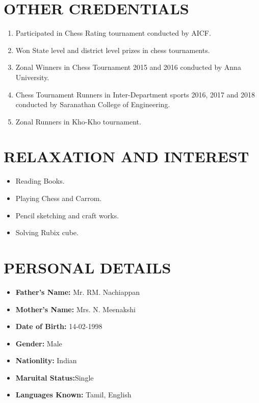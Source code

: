 \documentclass[margin,line]{res}
\begin{document}
\begin{resume}
\section{\sc OTHER CREDENTIALS}
\begin{enumerate}
\item Participated in Chess Rating tournament conducted by AICF.
\item Won State level and district level prizes in chess tournaments.
\item Zonal Winners in Chess Tournament 2015 and 2016 conducted by Anna University.
\item Chess Tournament Runners in Inter-Department sports 2016, 2017 and  2018 conducted by Saranathan College of Engineering.
\item Zonal Runners in Kho-Kho tournament.
\end{enumerate}

\section{\sc RELAXATION AND INTEREST}
\begin{itemize}
\item Reading Books.
\item Playing Chess and Carrom.
\item Pencil sketching and craft works.
\item Solving Rubix cube.
\end{itemize}


\section{\sc PERSONAL DETAILS}
\begin{itemize}
\item \textbf{Father’s Name:} Mr. RM. Nachiappan
\item \textbf{Mother’s Name:} Mrs. N. Meenakshi
\item \textbf{Date of Birth:} 14-02-1998
\item \textbf{Gender:} Male
\item \textbf{Nationlity:} Indian
\item \textbf{Maruital Status:}Single
\item \textbf{Languages Known:} Tamil, English
\end{itemize}


\end{resume}
\end{document}
